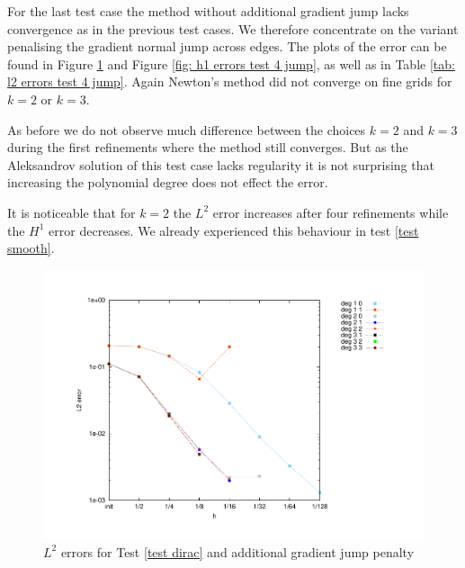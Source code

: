 

For the last test case the method without additional gradient jump lacks convergence as in the previous test cases. We therefore concentrate on the variant penalising the gradient normal jump across edges. The plots of the error can be found in Figure \ref{fig: l2 errors test 4 jump} and Figure \ref{fig: h1 errors test 4 jump}, as well as in Table \ref{tab: l2 errors test 4 jump}. Again Newton's method did not converge on fine grids for $k=2$ or $k=3$.

As before we do not observe much difference between the choices $k=2$ and $k=3$ during the first refinements where the method still converges. But as the Aleksandrov solution of this test case lacks regularity it is not surprising that increasing the polynomial degree does not effect the error.

It is noticeable that for $k=2$ the $L^2$ error increases after four refinements while the $H^1$ error decreases. We already experienced this behaviour in test \ref{test smooth}.

\begin{figure}[h]
	\centering
		\centering
		\includegraphics[scale =0.4]{plots/MA4_Neilan_GradJump_l2.pdf}
	\caption{$L^2$ errors for Test \ref{test dirac} and additional gradient jump penalty}
	\label{fig: l2 errors test 4 jump}
\end{figure}
	
